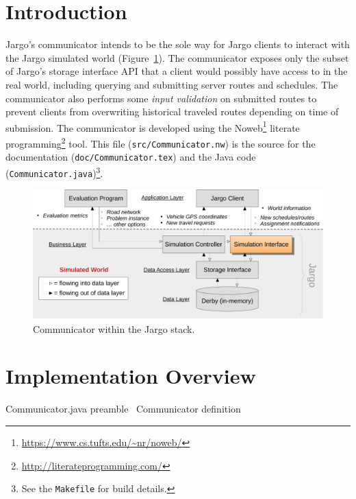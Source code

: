 \section{Introduction}
\label{sec:introduction}
Jargo's communicator intends to be the sole way for Jargo clients to interact
with the Jargo simulated world (Figure~\ref{fig:interface-fig}). The
communicator exposes only the subset of Jargo's storage interface API that a
client would possibly have access to in the real world, including querying and
submitting server routes and schedules. The communicator also performs some
\emph{input validation} on submitted routes to prevent clients from overwriting
historical traveled routes depending on time of submission.  The communicator
is developed using the
Noweb\footnote{\url{https://www.cs.tufts.edu/~nr/noweb/}} literate
programming\footnote{\url{http://literateprogramming.com/}} tool.  This file
({\tt{}src/Communicator.nw}) is the source for the documentation
({\tt{}doc/Communicator.tex}) and the Java code
({\tt{}Communicator.java})\footnote{See the {\tt{}Makefile} for build details.}.

\begin{figure}[h]
\centering
\includegraphics[width=150mm]{src/fig/interface-fig}
\caption{Communicator within the Jargo stack.}
\label{fig:interface-fig}
\end{figure}

\section{Implementation Overview}
\label{sec:implementation-overview}
\endmoddef{}
\LA{}Communicator.java preamble~{\nwtagstyle{}}\RA{}
\LA{}\code{}Communicator\edoc{} definition~{\nwtagstyle{}}\RA{}
\nwendcode{}\nwdocspar

